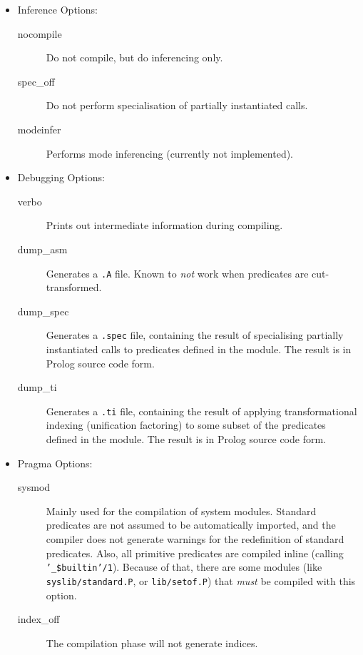 \begin{itemize}
\item   Inference Options:
	\begin{description}
        \item[nocompile] Do not compile, but do inferencing only.
	\item[spec\_off] Do not perform specialisation of partially
			 instantiated calls.
        \item[modeinfer] Performs mode inferencing (currently not implemented).
	\end{description}
\item   Debugging Options:
	\begin{description}
        \item[verbo]	Prints out intermediate information during compiling.
        \item[dump\_asm] Generates a {\tt *.A} file.  Known to {\em not\/}
			work when predicates are cut-transformed.
	\item[dump\_spec] Generates a {\tt *.spec} file, containing the result
			of specialising partially instantiated calls to
			predicates defined in the module.  The result is in
			Prolog source code form.
	\item[dump\_ti] Generates a {\tt *.ti} file, containing the result
			of applying transformational indexing (unification
			factoring) to some subset of the predicates defined
			in the module.  The result is in Prolog source code
			form.
	\end{description}
\item   Pragma Options:
	\begin{description}
        \item[sysmod]	Mainly used for the compilation of system modules.
			Standard predicates are not assumed to be automatically
			imported, and the compiler does not generate warnings
			for the redefinition of standard predicates.
			Also, all primitive predicates are compiled inline
			(calling {\tt '\_\$builtin'/1}).  Because of that,
			there are some modules (like {\tt syslib/standard.P},
			or {\tt lib/setof.P}) that {\em must\/} be compiled
			with this option.
        \item[index\_off] The compilation phase will not generate indices.
	\end{description}
\end{itemize}

